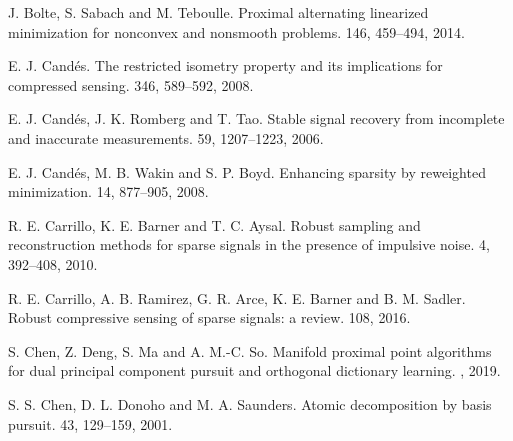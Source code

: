 \documentclass[10pt]{article}
\numberwithin{equation}{section}
\begin{document}
\begin{thebibliography}{99}
J. Bolte, S. Sabach and M. Teboulle.
\newblock Proximal alternating linearized minimization for nonconvex and nonsmooth problems.
 146, 459--494, 2014.

%

E. J. Cand\'{e}s.
\newblock The restricted isometry property and its implications for compressed sensing.
 346, 589--592, 2008.

E. J. Cand\'{e}s, J. K. Romberg and T. Tao.
\newblock Stable signal recovery from incomplete and inaccurate measurements.
 59, 1207--1223, 2006.

E. J. Cand\'{e}s, M. B. Wakin and S. P. Boyd.
\newblock Enhancing sparsity by reweighted $\mathop{l_1}$ minimization.
 14, 877--905, 2008.


R. E. Carrillo, K. E. Barner and T. C. Aysal.
\newblock Robust sampling and reconstruction methods for sparse signals in the presence of impulsive noise.
 4, 392--408, 2010.

R. E. Carrillo, A. B. Ramirez, G. R. Arce, K. E. Barner and B. M. Sadler.
\newblock Robust compressive sensing of sparse signals: a review.
 108, 2016.

S. Chen, Z. Deng, S. Ma and A. M.-C. So.
\newblock Manifold proximal point algorithms for dual principal component pursuit and orthogonal dictionary learning.
, 2019.

S. S. Chen, D. L. Donoho and M. A. Saunders.
\newblock Atomic decomposition by basis pursuit.
 43, 129--159, 2001.



\end{thebibliography}
\end{document}

